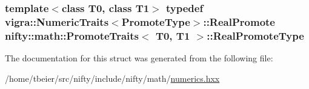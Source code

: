 \subsubsection[{Real\+Promote\+Type}]{\setlength{\rightskip}{0pt plus 5cm}template$<$class T0, class T1$>$ typedef vigra\+::\+Numeric\+Traits$<${\bf Promote\+Type}$>$\+::Real\+Promote {\bf nifty\+::math\+::\+Promote\+Traits}$<$ T0, T1 $>$\+::{\bf Real\+Promote\+Type}}\label{structnifty_1_1math_1_1PromoteTraits_a21f91936d2b9aff18c220bc86529df98}


The documentation for this struct was generated from the following file\+:\begin{DoxyCompactItemize}
\item 
/home/tbeier/src/nifty/include/nifty/math/\hyperlink{numerics_8hxx}{numerics.\+hxx}\end{DoxyCompactItemize}
